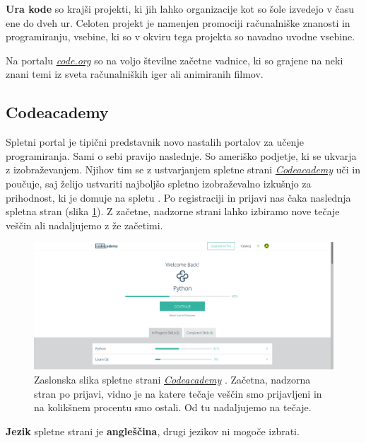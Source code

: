 \textbf{Ura kode} so krajši projekti, ki jih lahko organizacije kot so
šole izvedejo v času ene do dveh ur. Celoten projekt je namenjen
promociji računalniške znanosti in programiranju, vsebine, ki so v
okviru tega projekta so navadno uvodne vsebine.

Na portalu \emph{\href{https://code.org}{code.org}} so na voljo
številne začetne vadnice, ki so grajene na neki znani temi iz sveta
računalniških iger ali animiranih filmov. 

\subsection{Codeacademy}

Spletni portal je tipični predstavnik novo nastalih portalov za učenje
programiranja. Sami o sebi pravijo naslednje. So ameriško podjetje, ki
se ukvarja z izobraževanjem. Njihov tim se z ustvarjanjem spletne
strani \emph{\href{https://www.codecademy.com/}{Codeacademy}} uči in
poučuje, saj želijo ustvariti najboljšo spletno izobraževalno izkušnjo
za prihodnost, ki je domuje na spletu \cite{web:codeacademy}. Po
registraciji in prijavi nas čaka naslednja spletna stran (slika
\ref{fig:scr:web:codeacademy}). Z začetne, nadzorne strani lahko
izbiramo nove tečaje veščin ali nadaljujemo z že začetimi.

\begin{figure}[h!]
    \includegraphics [width=1\linewidth, keepaspectratio =
    1] {./images/sc_web/codeacademy_login_01.png}
    \caption{Zaslonska slika spletne strani
      \emph{\href{https://www.codecademy.com/}{Codeacademy}}
      \cite{web:codeacademy}. Začetna, nadzorna stran po prijavi,
      vidno je na katere tečaje veščin smo prijavljeni in na kolikšnem
    procentu smo ostali. Od tu nadaljujemo na tečaje.}
    \label{fig:scr:web:codeacademy}
\end{figure}

\textbf{Jezik} spletne strani je \textbf{angleščina}, drugi jezikov ni
mogoče izbrati.

